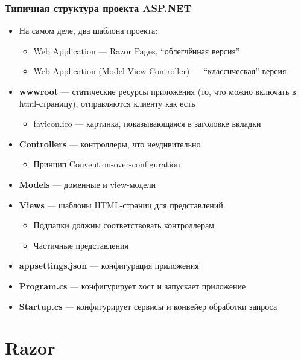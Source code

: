 \documentclass{../../slides-style}
\begin{document}
    \begin{frame}
        \frametitle{Типичная структура проекта ASP.NET}
        \begin{itemize}
            \item На самом деле, два шаблона проекта:
            \begin{itemize}
                \item Web Application --- Razor Pages, \enquote{облегчённая версия}
                \item Web Application (Model-View-Controller) --- \enquote{классическая} версия
            \end{itemize}
            \item \textbf{wwwroot} --- статические ресурсы приложения (то, что можно включать в html-страницу), отправляются клиенту как есть
            \begin{itemize}
                \item favicon.ico --- картинка, показывающаяся в заголовке вкладки
            \end{itemize}
            \item \textbf{Controllers} --- контроллеры, что неудивительно
            \begin{itemize}
                \item Принцип Convention-over-configuration
            \end{itemize}
            \item \textbf{Models} --- доменные и view-модели
            \item \textbf{Views} --- шаблоны HTML-страниц для представлений
            \begin{itemize}
                \item Подпапки должны соответствовать контроллерам
                \item Частичные представления
            \end{itemize}
            \item \textbf{appsettings.json} --- конфигурация приложения
            \item \textbf{Program.cs} --- конфигурирует хост и запускает приложение
            \item \textbf{Startup.cs} --- конфигурирует сервисы и конвейер обработки запроса
        \end{itemize}
    \end{frame}

    \section{Razor}
\end{document}
